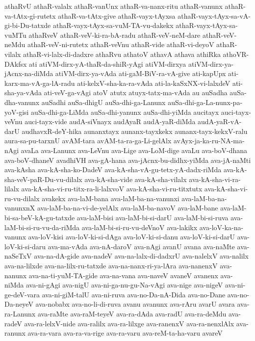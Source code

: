 {athaRvU
athaR-valalx
athaR-vanUnx
athaR-va-nanx-ritu
athaR-vanunx
athaR-va-tAtx-gi-rutetx
athaR-va-tAtx-give
athaR-vayx-tAyxsa
athaR-vayx-tAyx-sa-vA-gi-bi-Du-tatxde
athaR-vayx-tAyx-sa-vuM-TA-vu-dakekx
athaR-vayx-tAyx-sa-vuMTu
athaRveV
athaR-veV-ki-ra-bA-radu
athaR-veV-neM-dare
athaR-veV-neMdu
athaR-veV-ni-rutetx
athaR-veVnu
athaR-vide
athaR-vi-deyoV
athaR-vilalx
athaR-vi-lalx-di-dadxre
athaRvu
athatoV
athavA
athava
athiRka
athoVR-DAkfsx
ati
atiVM-dirx-yA-thaR-da-shiR-yAgi
atiVM-dirxya
atiVM-dirx-ya-jAcnx-na-diMda
atiVM-dirx-ya-vAda
ati-gaM-BiV-ra-vA-give
ati-kapUpx
ati-karx-ma-vA-ga-lA-radu
ati-kelxV-sha-ka-ra-vAda
ati-la-kaSxNX-vi-lalxdeV
ati-sha-ya-vAda
ati-veV-ga-vAgi
atoV
atutx
atuyx-tatx-ma-vAda
au
auSadha
auSa-dha-vanunx
auSadhi
auSa-dhigU
auSa-dhi-ga-Lanunx
auSa-dhi-ga-La-nunx-pa-yoV-gisi
auSa-dhi-ga-LiMda
auSa-dhi-yanunx
auSa-dhi-yiMda
aucitayx
auci-tayx-veVnu
auci-tayx-vide
audA-siVnayx
audAyaR
audA-yaR-diMda
audA-yaR-vA-darU
audhavxR-deY-hika
aunanxtayx
aunanx-tayxkekx
aunanx-tayx-kekxV-ralu
aura-sa-pu-tarxnU
avAM-tara
avAM-ta-ra-ga-Li-gelAlx
avAyx-ja-ka-ru-NA-ma-nAgi
avaLa
ava-Lanunx
ava-LeVnu
ava-Lige
ava-LoM-dige
avaLu
ava-boV-dhana
ava-boV-dhaneV
avadhiVH
ava-gA-hana
ava-jAcnx-bu-didhx-yiMda
ava-jA-naMti
ava-kAsha
ava-kA-sha-ko-DadeV
ava-kA-sha-vA-gu-tetx-yA-dadx-riMda
ava-kA-sha-veV-paR-Du-vu-dilalx
ava-kA-sha-vide
ava-kA-sha-vilalx
ava-kA-sha-vi-ra-lilalx
ava-kA-sha-vi-ru-titx-ra-li-lalxvoV
ava-kA-sha-vi-ru-titxtutx
ava-kA-sha-vi-ru-vu-dilalx
avakekx
ava-laM-bana
ava-laM-ba-na-vanunxi
ava-laM-ba-na-vanunxnX
ava-laM-ba-na-vi-de-yelAlx
ava-laM-ba-navoV
ava-laM-bane
ava-laM-bi-sa-beV-kA-gu-tatxde
ava-laM-bisi
ava-laM-bi-si-darU
ava-laM-bi-si-ruva
ava-laM-bi-si-ru-vu-da-riMda
ava-laM-bi-si-ru-vu-deVnoV
ava-lakikx
ava-loV-ka-na-vanunx
ava-loV-kisi
ava-loV-ki-si-dAga
ava-loV-ki-si-danu
ava-loV-ki-si-darU
ava-loV-ki-si-daru
ava-ma-vAda
ava-nA-daroV
ava-nAgi
avanU
avana
ava-naMte
ava-naSeTxV
ava-na-dA-gide
ava-nadeV
ava-na-lalx-di-dadxrU
ava-nalelxV
ava-nalilx
ava-na-lilxde
ava-na-lilx-ru-tatxde
ava-na-nanx-ri-ya-lAra
ava-nanenxV
ava-nanunx
ava-na-ti-yuM-TA-gide
ava-na-vana
ava-naveV
avaneV
avanenx
ava-niMda
ava-ni-gAgi
ava-nigU
ava-ni-ga-nu-gu-Na-vAgi
ava-nige
ava-nigeV
ava-ni-ge-deV-vara
ava-ni-giM-talU
ava-ni-ruva
ava-no-Da-nA-Dida
ava-no-Dane
ava-no-Da-neyeV
ava-nobabx
ava-no-li-di-ruva
avanu
avanunx
ava-rAru
avarU
avara
ava-ra-Lanunx
ava-raMte
ava-raM-teyeV
ava-ra-dAda
ava-radU
ava-ra-deMdu
ava-radeV
ava-ra-lelxV-nide
ava-ralilx
ava-ra-lilxge
ava-ranenxV
ava-ra-nenxlAlx
ava-ranunx
ava-ra-vara
ava-ra-va-rige
ava-ra-varu
ava-reM-ta-ha-varu
avareV
}
